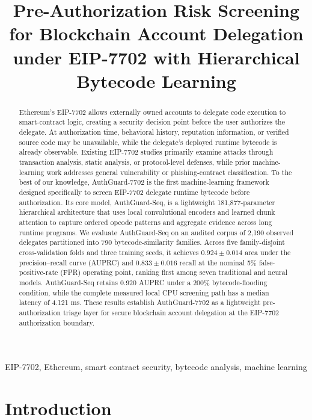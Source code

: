 \documentclass[conference]{IEEEtran}
\begin{document}
\title{Pre-Authorization Risk Screening for Blockchain Account Delegation under EIP-7702 with Hierarchical Bytecode Learning}



\maketitle

\begin{abstract}
Ethereum's EIP-7702 allows externally owned accounts to delegate code execution to smart-contract logic, creating a security decision point before the user authorizes the delegate. At authorization time, behavioral history, reputation information, or verified source code may be unavailable, while the delegate's deployed runtime bytecode is already observable. Existing EIP-7702 studies primarily examine attacks through transaction analysis, static analysis, or protocol-level defenses, while prior machine-learning work addresses general vulnerability or phishing-contract classification. To the best of our knowledge, AuthGuard-7702 is the first machine-learning framework designed specifically to screen EIP-7702 delegate runtime bytecode before authorization. Its core model, AuthGuard-Seq, is a lightweight 181,877-parameter hierarchical architecture that uses local convolutional encoders and learned chunk attention to capture ordered opcode patterns and aggregate evidence across long runtime programs. We evaluate AuthGuard-Seq on an audited corpus of 2,190 observed delegates partitioned into 790 bytecode-similarity families. Across five family-disjoint cross-validation folds and three training seeds, it achieves $0.924\pm0.014$ area under the precision--recall curve (AUPRC) and $0.833\pm0.016$ recall at the nominal 5\% false-positive-rate (FPR) operating point, ranking first among seven traditional and neural models. AuthGuard-Seq retains 0.920 AUPRC under a 200\% bytecode-flooding condition, while the complete measured local CPU screening path has a median latency of 4.121 ms. These results establish AuthGuard-7702 as a lightweight pre-authorization triage layer for secure blockchain account delegation at the EIP-7702 authorization boundary.
\end{abstract}

\begin{IEEEkeywords}
EIP-7702, Ethereum, smart contract security, bytecode analysis, machine learning
\end{IEEEkeywords}

\section{Introduction}
\label{sec:intro}
\end{document}
